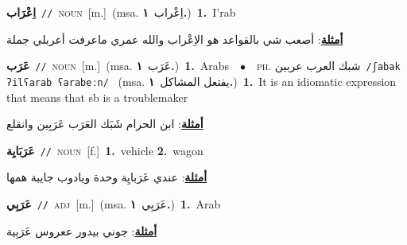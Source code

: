 \documentclass[10pt,a4paper,twoside]{article} %
\begin{document}
\begin{multicols}{2}
{\setlength\topsep{0pt}\textbf{\foreignlanguage{arabic}{اِعْرَاب}}\ {\color{gray}\texttt{//}\color{black}}\ \textsc{noun}\ [m.]\ \color{gray}(msa. \foreignlanguage{arabic}{اِعْراب}~\foreignlanguage{arabic}{\textbf{١.}})\color{black}\ \textbf{1.}~I'rab\  \begin{flushright}\color{gray}\foreignlanguage{arabic}{\textbf{\underline{\foreignlanguage{arabic}{أمثلة}}}: أصعب شي بالقواعد هو الاِعْراب والله عمري ماعرفت أعربلي جملة}\end{flushright}\color{black}} \vspace{2mm}

{\setlength\topsep{0pt}\textbf{\foreignlanguage{arabic}{عَرَب}}\ {\color{gray}\texttt{//}\color{black}}\ \textsc{noun}\ [m.]\ \color{gray}(msa. \foreignlanguage{arabic}{عَرَب}~\foreignlanguage{arabic}{\textbf{١.}})\color{black}\ \textbf{1.}~Arabs\ \ $\bullet$\ \ \textsc{ph.} \color{gray} \foreignlanguage{arabic}{شبك العرب عربين}\color{black}\ {\color{gray}\texttt{/{\sffamily ʃabak ʔilʕarab ʕarabeːn}/}\color{black}}\ \color{gray} (msa. \foreignlanguage{arabic}{يفتعل المشاكل}~\foreignlanguage{arabic}{\textbf{١.}})\color{black}\ \textbf{1.}~It is an idiomatic expression that means that sb is a troublemaker\  \begin{flushright}\color{gray}\foreignlanguage{arabic}{\textbf{\underline{\foreignlanguage{arabic}{أمثلة}}}: ابن الحرام شَبَك العَرَب عَرَبِين وانقلع}\end{flushright}\color{black}} \vspace{2mm}

{\setlength\topsep{0pt}\textbf{\foreignlanguage{arabic}{عَرَبَايِة}}\ {\color{gray}\texttt{//}\color{black}}\ \textsc{noun}\ [f.]\ \textbf{1.}~vehicle  \textbf{2.}~wagon\  \begin{flushright}\color{gray}\foreignlanguage{arabic}{\textbf{\underline{\foreignlanguage{arabic}{أمثلة}}}: عندي عَرَبايِة وحدة ويادوب جايبة همها}\end{flushright}\color{black}} \vspace{2mm}

{\setlength\topsep{0pt}\textbf{\foreignlanguage{arabic}{عَرَبِي}}\ {\color{gray}\texttt{//}\color{black}}\ \textsc{adj}\ [m.]\ \color{gray}(msa. \foreignlanguage{arabic}{عَرَبِي}~\foreignlanguage{arabic}{\textbf{١.}})\color{black}\ \textbf{1.}~Arab\  \begin{flushright}\color{gray}\foreignlanguage{arabic}{\textbf{\underline{\foreignlanguage{arabic}{أمثلة}}}: جوني بيدور ععروس عَرَبِية}\end{flushright}\color{black}} \vspace{2mm}


\end{multicols}
\end{document}
